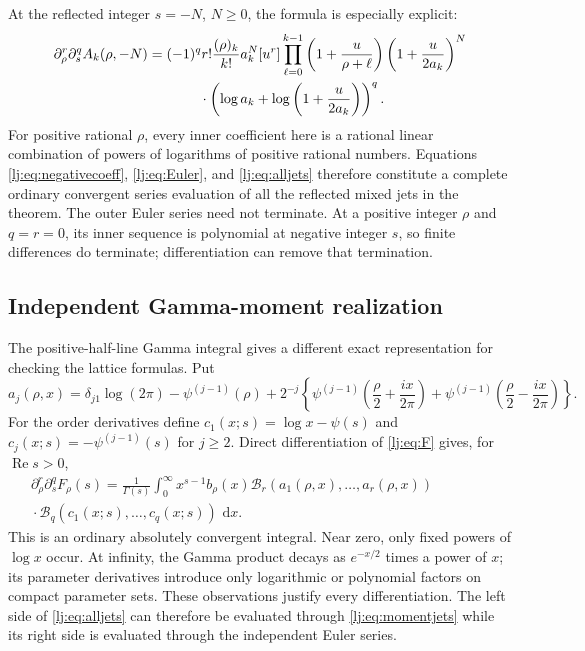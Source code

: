 \documentclass[11pt,a4paper]{article}
\numberwithin{equation}{section}
\theoremstyle{definition}
\theoremstyle{remark}
\DeclareMathOperator{\re}{Re}
\newcommand{\dd}{\,\mathrm d}
\begin{document}
At the reflected integer $s=-N$, $N\geq0$, the formula is especially
explicit:
\begin{equation}
\begin{split}
 \partial_\rho^r\partial_s^q A_k(\rho,-N)
 &=(-1)^q r!\frac{(\rho)_k}{k!}a_k^N[u^r]
       \prod_{\ell=0}^{k-1}\left(1+\frac{u}{\rho+\ell}\right)
       \left(1+\frac{u}{2a_k}\right)^N\\
 &\hspace{13mm}\cdot
       \left(\log a_k+\log\left(1+\frac{u}{2a_k}\right)\right)^q.
\end{split}
 \label{lj:eq:negativecoeff}
\end{equation}
For positive rational $\rho$, every inner coefficient here is a rational
linear combination of powers of logarithms of positive rational numbers.
Equations \eqref{lj:eq:negativecoeff}, \eqref{lj:eq:Euler}, and
\eqref{lj:eq:alljets} therefore constitute a complete ordinary convergent
series evaluation of all the reflected mixed jets in the theorem.
The outer Euler series need not terminate. At a positive integer $\rho$
and $q=r=0$, its inner sequence is polynomial at negative integer $s$,
so finite differences do terminate; differentiation can remove that
termination.

\subsection{Independent Gamma-moment realization}

The positive-half-line Gamma integral gives a different exact
representation for checking the lattice formulas. Put
\begin{equation}
 a_j(\rho,x)=\delta_{j1}\log(2\pi)-\psi^{(j-1)}(\rho)
  +2^{-j}\left\{
   \psi^{(j-1)}\left(\frac\rho2+\frac{ix}{2\pi}\right)
  +\psi^{(j-1)}\left(\frac\rho2-\frac{ix}{2\pi}\right)\right\}.
 \label{lj:eq:Gammajet}
\end{equation}
For the order derivatives define $c_1(x;s)=\log x-\psi(s)$ and
$c_j(x;s)=-\psi^{(j-1)}(s)$ for $j\geq2$. Direct differentiation of
\eqref{lj:eq:F} gives, for $\re s>0$,
\begin{equation}
\begin{split}
 \partial_\rho^r\partial_s^qF_\rho(s)
  =\frac1{\Gamma(s)}\int_0^\infty
      x^{s-1}b_\rho(x)
      \mathcal B_r(a_1(\rho,x),\ldots,a_r(\rho,x))\qquad\qquad\\[-2pt]
      {}\cdot\mathcal B_q(c_1(x;s),\ldots,c_q(x;s))\,\dd x.
\end{split}
 \label{lj:eq:momentjets}
\end{equation}
This is an ordinary absolutely convergent integral. Near zero, only
fixed powers of $\log x$ occur. At infinity, the Gamma product decays
as $e^{-x/2}$ times a power of $x$; its parameter derivatives introduce
only logarithmic or polynomial factors on compact parameter sets.
These observations justify every differentiation. The left side of
\eqref{lj:eq:alljets} can therefore be evaluated through
\eqref{lj:eq:momentjets} while its right side is evaluated through
the independent Euler series.
\end{document}
